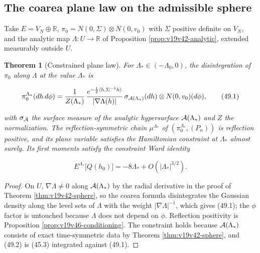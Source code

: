\documentclass[11pt]{article}
\newtheorem{theorem}{Theorem}[section]
\theoremstyle{remark}
\begin{document}
\subsection{The coarea plane law on the admissible sphere}

Take \(E=V_N\oplus\mathbb R\), \(\pi_0=N(0,\Sigma)\otimes N(0,v_0)\) with
\(\Sigma\) positive definite on \(V_N\), and the analytic map
\(\Lambda:U\to\mathbb R\) of Proposition \ref{prop:v19v42-analytic},
extended measurably outside \(U\).

\begin{theorem}[Constrained plane law]
\label{thm:v19v46-plane}
For \(\Lambda_*\in(-\Lambda_0,0)\), the disintegration of \(\pi_0\) along
\(\Lambda\) at the value \(\Lambda_*\) is

\[
 \pi_0^{\Lambda_*}(dh\,d\phi)
 =\frac1{Z(\Lambda_*)}\,
 \frac{e^{-\frac12\langle h,\Sigma^{-1}h\rangle}}{|\nabla\Lambda(h)|}\,
 \sigma_{{\cal A}(\Lambda_*)}(dh)\otimes N(0,v_0)(d\phi),               \tag{49.1}
\]

with \(\sigma_{{\cal A}}\) the surface measure of the analytic
hypersurface \({\cal A}(\Lambda_*)\) and \(Z\) the normalization.  The
reflection-symmetric chain \(\mu^{\Lambda_*}\) of
\((\pi_0^{\Lambda_*},(P_n))\) is reflection positive, and its plane
variable satisfies the Hamiltonian constraint at \(\Lambda_*\) almost
surely.  Its first moments satisfy the constraint Ward identity

\[
 E^{\Lambda_*}\bigl[Q(h_0)\bigr]=-8\Lambda_*+O(|\Lambda_*|^{3/2}).       \tag{49.2}
\]
\end{theorem}

\begin{proof}
On \(U\), \(\nabla\Lambda\neq0\) along \({\cal A}(\Lambda_*)\) by the
radial derivative in the proof of Theorem \ref{thm:v19v42-sphere}, so
the coarea formula disintegrates the Gaussian density along the level
sets of \(\Lambda\) with the weight \(|\nabla\Lambda|^{-1}\), which
gives (49.1); the \(\phi\) factor is untouched because \(\Lambda\) does
not depend on \(\phi\).  Reflection positivity is Proposition
\ref{prop:v19v46-conditioning}.  The constraint holds because
\({\cal A}(\Lambda_*)\) consists of exact time-symmetric data by
Theorem \ref{thm:v19v42-sphere}, and (49.2) is (45.3) integrated
against (49.1).
\end{proof}
\end{document}
